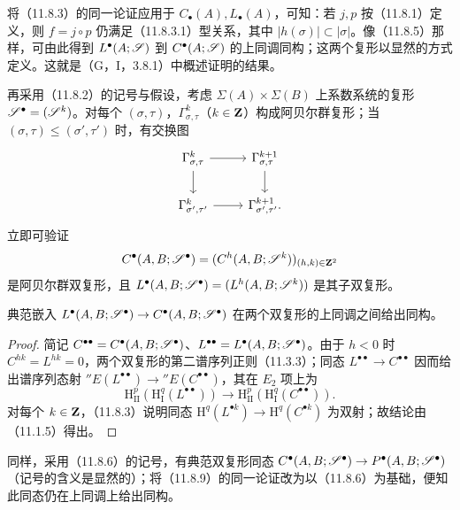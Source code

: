 将（11.8.3）的同一论证应用于 $C_\bullet(A),L_\bullet(A)$，可知：若 $j,p$ 按（11.8.1）定义，则 $f=j\circ p$ 仍满足（11.8.3.1）型关系，其中 $|h(\sigma)|\subset|\sigma|$。像（11.8.5）那样，可由此得到 $L^\bullet(A;\mathscr S)$ 到 $C^\bullet(A;\mathscr S)$ 的上同调同构；这两个复形以显然的方式定义。这就是（G，I，3.8.1）中概述证明的结果。

再采用（11.8.2）的记号与假设，考虑 $\Sigma(A)\times\Sigma(B)$ 上系数系统的复形 $\mathscr S^\bullet=(\mathscr S^k)$。对每个 $(\sigma,\tau)$，$\Gamma^k_{\sigma,\tau}$（$k\in\mathbf Z$）构成阿贝尔群复形；当 $(\sigma,\tau)\leq(\sigma',\tau')$ 时，有交换图
\[
\begin{tikzcd}
\Gamma^k_{\sigma,\tau}\arrow[r]\arrow[d]&\Gamma^{k+1}_{\sigma,\tau}\arrow[d]\\
\Gamma^k_{\sigma',\tau'}\arrow[r]&\Gamma^{k+1}_{\sigma',\tau'}.
\end{tikzcd}
\]
立即可验证
\[
C^\bullet(A,B;\mathscr S^\bullet)=(C^h(A,B;\mathscr S^k))_{(h,k)\in\mathbf Z^2}
\]
是阿贝尔群双复形，且 $L^\bullet(A,B;\mathscr S^\bullet)=(L^h(A,B;\mathscr S^k))$ 是其子双复形。

典范嵌入 $L^\bullet(A,B;\mathscr S^\bullet)\to C^\bullet(A,B;\mathscr S^\bullet)$ 在两个双复形的上同调之间给出同构。
\begin{proof}
简记 $C^{\bullet\bullet}=C^\bullet(A,B;\mathscr S^\bullet)$、$L^{\bullet\bullet}=L^\bullet(A,B;\mathscr S^\bullet)$。由于 $h<0$ 时 $C^{hk}=L^{hk}=0$，两个双复形的第二谱序列正则（11.3.3）；同态 $L^{\bullet\bullet}\to C^{\bullet\bullet}$ 因而给出谱序列态射 ${}''E(L^{\bullet\bullet})\to{}''E(C^{\bullet\bullet})$，其在 $E_2$ 项上为
\begin{equation}\tag{11.8.9.1}
\mathrm H_{\mathrm{II}}^p(\mathrm H_{\mathrm I}^q(L^{\bullet\bullet}))
\longrightarrow\mathrm H_{\mathrm{II}}^p(\mathrm H_{\mathrm I}^q(C^{\bullet\bullet})).
\end{equation}
对每个 $k\in\mathbf Z$，（11.8.3）说明同态 $\mathrm H^q(L^{\bullet k})\to\mathrm H^q(C^{\bullet k})$ 为双射；故结论由（11.1.5）得出。
\end{proof}

同样，采用（11.8.6）的记号，有典范双复形同态 $C^\bullet(A,B;\mathscr S^\bullet)\to P^\bullet(A,B;\mathscr S^\bullet)$（记号的含义是显然的）；将（11.8.9）的同一论证改为以（11.8.6）为基础，便知此同态仍在上同调上给出同构。

